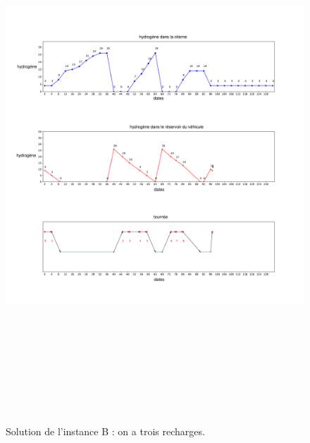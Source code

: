 	\begin{figure}[H]
	\centerline{
		\includegraphics[height=20cm]{images_these/DPS_sol_24.pdf}}
	\caption[La solution de l'instance B]{Solution de l'instance B : on a trois recharges.}
	\label{S_Inst_1}
\end{figure}

